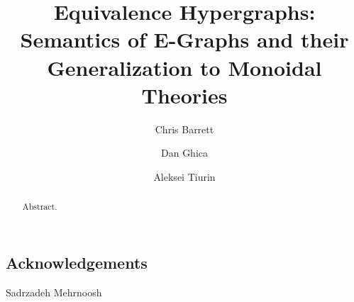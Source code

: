 \documentclass
  [ acmsmall
  , pdftex
  , dvipsnames
  , review
  , nonacm
  , screen
  ]{acmart}
\title{Equivalence Hypergraphs:\\ Semantics of E-Graphs and their Generalization to 
Monoidal Theories}
\author{Chris Barrett}
\author{Dan Ghica}
\author{Aleksei Tiurin}
\begin{document}
\begin{abstract}
Abstract.
\end{abstract}

\maketitle









\subsection*{Acknowledgements}
Sadrzadeh Mehrnoosh 

\clearpage


\end{document}
